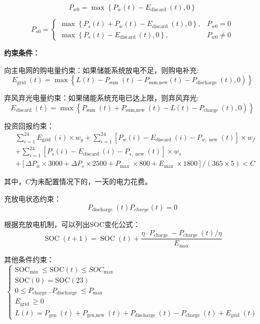 \documentclass{cumcmthesis}
\begin{document}
$$
P_{w 0}=\max \left\{P_w(t)-E_{\text {discard }}(t), 0\right\}
$$

$$
P_{s 0}= \begin{cases}\max \left\{P_s(t)+P_w(t)-E_{\text {discard }}(t), 0\right\}, & P_{w 0}=0 \\ \max \left\{P_s(t)-E_{\text {discard }}(t), 0\right\}, & P_{w 0} \neq 0\end{cases}
$$

\textbf{约束条件：}

向主电网的购电量约束：如果储能系统放电不足，则购电补充:
\begin{equation}
\left.E_{\text {grid }}(t)=\max \left\{L(t)-P_{\text {sum }}(t)-P_{\text {sum,new}}(t)-P_{\text {discharge }}(t), 0\right)\right\}
\end{equation}

弃风弃光电量约束：如果储能系统充电已达上限，则弃风弃光:
\begin{equation}
\left.E_{\text {discard }}(t)=\max \left\{P_{\text {sum }}(t)+P_{\text {sum,new }}(t)-L(t)-P_{\text {charge }}(t), 0\right)\right\}
\end{equation}

投资回报约束：
\begin{equation}
\begin{aligned}
& \sum_{i=1}^{24} E_{\text {grid }}(i) \times w_g +\sum_{i=1}^{24}\left[P_w(i)-E_{\text {discard }}(i)-P_{w, \text { new }}(t)\right] \times w_f \\
&+\sum_{i=1}^{24}\left[P_s(i)-E_{\text {discard }}(i)-P_{s, \text { new }}(t)\right] \times w_s \\
&+\left[\Delta P_w \times 3000+\Delta P_s \times 2500+P_{\text {max }} \times 800+E_{\text {max }} \times 1800\right] / (365 \times 5)< C
\end{aligned}
\end{equation}

其中，$C$为未配置情况下的，一天的电力花费。

充放电状态约束：
\begin{equation}
P_{\text {discharge }}(t) P_{charge}(t)=0
\end{equation}

根据充放电机制，可以列出SOC变化公式：
$$
\operatorname{SOC}(t+1)=\operatorname{SOC}(t)+\frac{\eta \cdot P_{\text {charge }}-P_{\text {charge }}(t) / \eta}{E_{\max }}
$$

其他条件约束：
\begin{equation}
\left\{\begin{array}{l}
\mathrm{SOC}_{\text {min }} \leqslant \mathrm{SOC}(t) \leqslant S O C_{\text {max }} \\
\mathrm{SOC}(0)=\mathrm{SOC}(23)\\
0 \leqslant P_{\text {charge }}, P_{\text {discharge }} \leqslant P_{\text {max }} \\
E_{\text {grid }} \geqslant 0 \\
L(t)=P_{\text {gen }}(t)+P_{\text {gen,new }}(t)+P_{\text {discharge }}(t)-P_{\text {charge }}(t)+E_{\text {grid }}(t)
\end{array}\right.
\end{equation}
  
\end{document}
